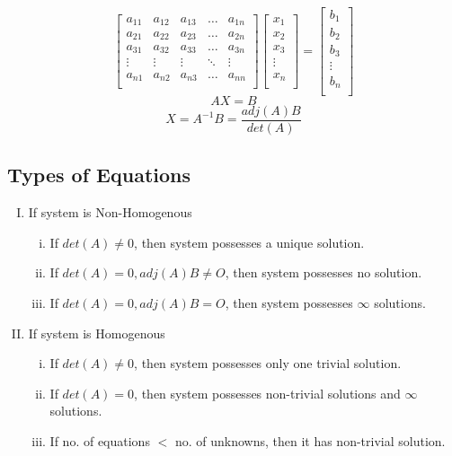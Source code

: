 \documentclass{article}
\begin{document}
$$\begin{bmatrix}
        a_{11} & a_{12} & a_{13} & \ldots & a_{1n} \\
        a_{21} & a_{22} & a_{23} & \ldots & a_{2n} \\
        a_{31} & a_{32} & a_{33} & \ldots & a_{3n} \\
        \vdots & \vdots & \vdots & \ddots & \vdots \\
        a_{n1} & a_{n2} & a_{n3} & \ldots & a_{nn} \\
    \end{bmatrix} \begin{bmatrix}
        x_{1}  \\
        x_{2}  \\
        x_{3}  \\
        \vdots \\
        x_{n}  \\
    \end{bmatrix}=\begin{bmatrix}
        b_{1}  \\
        b_{2}  \\
        b_{3}  \\
        \vdots \\
        b_{n}  \\
    \end{bmatrix}$$
$$AX=B$$
$$X=A^{-1}B=\dfrac{adj(A)B}{det(A)}$$
\subsection{Types of Equations}
\begin{enumerate}[I.]
    \item If system is Non-Homogenous
          \begin{enumerate}[i.]
              \item If $det(A)\not=0$, then system possesses a unique solution.
              \item If $det(A)=0, adj(A)B \not= O$, then system possesses no solution.
              \item If $det(A)=0, adj(A)B=O$, then system possesses $\infty$ solutions.
          \end{enumerate}
    \item If system is Homogenous
          \begin{enumerate}[i.]
              \item If $det(A)\not=0$, then system possesses only one trivial solution.
              \item If $det(A)=0$, then system possesses non-trivial solutions and $\infty$ solutions.
              \item If no. of equations $<$ no. of unknowns, then it has non-trivial solution.
          \end{enumerate}
\end{enumerate}
\end{document}
